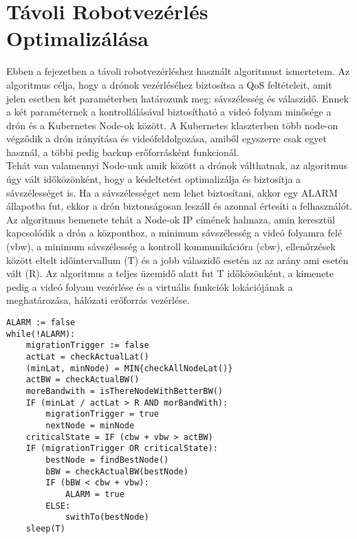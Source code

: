 \chapter{Távoli Robotvezérlés Optimalizálása}

Ebben a fejezetben a távoli robotvezérléshez használt algoritmust ismertetem. Az algoritmus célja, hogy a drónok vezérléséhez biztosítsa a QoS feltételeit, amit jelen esetben két paraméterben határozunk meg: sávszélesség és válaszidő. Ennek a két paraméternek a kontrollálásával biztosítható a videó folyam minősége a drón és a Kubernetes Node-ok között. A Kubernetes klaszterben több node-on végződik a drón irányítása és videófeldolgozása, amiből egyszerre csak egyet használ, a többi pedig backup erőforrásként funkcionál. \\

\noindent
Tehát van valamennyi Node-unk amik között a drónok válthatnak, az algoritmus úgy vált időközönként, hogy a késleltetést optimalizálja és biztosítja a sávszélességet is. Ha a sávszélességet nem lehet biztosítani, akkor egy ALARM állapotba fut, ekkor a drón biztonságosan leszáll és azonnal értesíti a felhasználót. \\

\noindent
Az algoritmus bemenete tehát a Node-ok IP címének halmaza, amin keresztül kapcsolódik a drón a központhoz, a minimum sávszélesség a videó folyamra felé (vbw), a minimum sávszélesség a kontroll kommunikációra (cbw), ellenőrzések között eltelt időintervallum (T) és a jobb válaszidő esetén az az arány ami esetén vált (R). Az algoritmus a teljes üzemidő alatt fut T időközönként, a kimenete pedig a videó folyam vezérlése és a virtuális funkciók lokációjának a meghatározása, hálózati erőforrás vezérlése.

\begin{lstlisting}[caption={Az optimalizáló algoritmus}]
ALARM := false
while(!ALARM):
	migrationTrigger := false
	actLat = checkActualLat()
	(minLat, minNode) = MIN{checkAllNodeLat()}
	actBW = checkActualBW()
	moreBandwith = isThereNodeWithBetterBW()
	IF (minLat / actLat > R AND morBandWith):
		migrationTrigger = true
		nextNode = minNode
	criticalState = IF (cbw + vbw > actBW)
	IF (migrationTrigger OR criticalState):
		bestNode = findBestNode()
		bBW = checkActualBW(bestNode)
		IF (bBW < cbw + vbw):
			ALARM = true
		ELSE:
			swithTo(bestNode)
	sleep(T)
\end{lstlisting}

